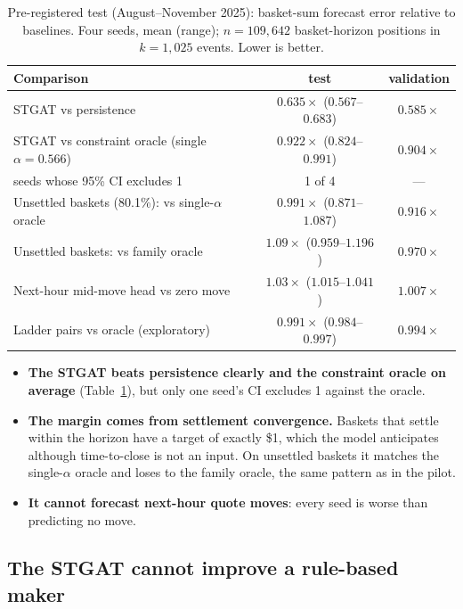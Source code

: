 \documentclass[11pt,a4paper]{article}
\newcommand{\x}{\ensuremath{\times}}
\begin{document}
\begin{table}[htbp]
\centering
\caption{Pre-registered test (August--November 2025): basket-sum forecast error relative to baselines. Four seeds,
mean (range); $n=109{,}642$ basket-horizon positions in $k=1{,}025$ events. Lower is better.}
\label{tab:forecast}
\begin{tabular}{lcc}
\toprule
Comparison & test & validation \\
\midrule
STGAT vs persistence & $\bm{0.635\x}$ ($0.567$--$0.683$) & $0.585\x$ \\
STGAT vs constraint oracle (single $\alpha=0.566$) & $\bm{0.922\x}$ ($0.824$--$0.991$) & $0.904\x$ \\
\quad seeds whose 95\% CI excludes 1 & 1 of 4 & --- \\
Unsettled baskets (80.1\%): vs single-$\alpha$ oracle & $0.991\x$ ($0.871$--$1.087$) & $0.916\x$ \\
Unsettled baskets: vs family oracle & $1.09\x$ ($0.959$--$1.196$) & $0.970\x$ \\
Next-hour mid-move head vs zero move & $1.03\x$ ($1.015$--$1.041$) & $1.007\x$ \\
Ladder pairs vs oracle (exploratory) & $0.991\x$ ($0.984$--$0.997$) & $0.994\x$ \\
\bottomrule
\end{tabular}
\end{table}

\begin{itemize}
  \item \textbf{The STGAT beats persistence clearly and the constraint oracle on average} (Table~\ref{tab:forecast}),
    but only one seed's CI excludes 1 against the oracle.
  \item \textbf{The margin comes from settlement convergence.} Baskets that settle within the horizon have a target
    of exactly \$1, which the model anticipates although time-to-close is not an input. On unsettled baskets it
    matches the single-$\alpha$ oracle and loses to the family oracle, the same pattern as in the pilot.
  \item \textbf{It cannot forecast next-hour quote moves}: every seed is worse than predicting no move.
\end{itemize}

\subsection{The STGAT cannot improve a rule-based maker}\label{sec:res-rule}
\end{document}
